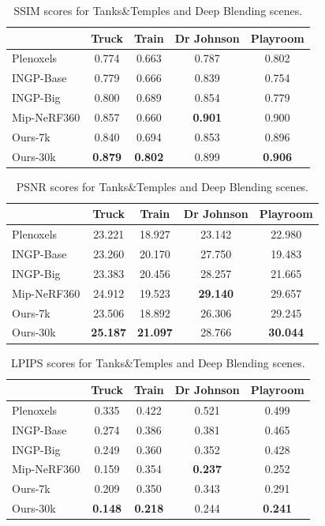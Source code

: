 \begin{appendix}
	\begin{table}[H]
	\caption{SSIM scores for Tanks\&Temples and Deep Blending scenes. }
		\centering
    \begin{tabular}{l|cc|cc}
	~ & Truck & Train & Dr Johnson & Playroom \\ \hline
	Plenoxels & 0.774 & 0.663 & 0.787 & 0.802 \\
	INGP-Base & 0.779 & 0.666 & 0.839 & 0.754 \\
	INGP-Big & 0.800 & 0.689 & 0.854 & 0.779 \\
	Mip-NeRF360 & 0.857 & 0.660 & \textbf{0.901} & 0.900 \\
	Ours-7k & 0.840 & 0.694 & 0.853 & 0.896 \\
	Ours-30k & \textbf{0.879} & \textbf{0.802} & 0.899 & \textbf{0.906} \\
\end{tabular}
\end{table}
	\begin{table}[H]
	\caption{PSNR scores for Tanks\&Temples and Deep Blending scenes. }
		\centering
		\begin{tabular}{l|cc|cc}
			~ & Truck  & Train & Dr Johnson & Playroom \\ \hline
			Plenoxels & 23.221 & 18.927 & 23.142 & 22.980 \\
			INGP-Base & 23.260  & 20.170 & 27.750 & 19.483 \\
			INGP-Big & 23.383  & 20.456 & 28.257 & 21.665 \\
			Mip-NeRF360 & 24.912  & 19.523 & \textbf{29.140} & 29.657 \\
			Ours-7k & 23.506  & 18.892 & 26.306 & 29.245 \\
			Ours-30k & \textbf{25.187} & \textbf{21.097} & 28.766 & \textbf{30.044} \\
		\end{tabular}
\end{table}


	\begin{table}[H]
	\caption{LPIPS scores for Tanks\&Temples and Deep Blending scenes. }
		\centering
    \begin{tabular}{l|cc|cc}
	~ & Truck & Train & Dr Johnson & Playroom \\ \hline
	Plenoxels & 0.335 & 0.422 & 0.521 & 0.499 \\
	INGP-Base & 0.274 & 0.386 & 0.381 & 0.465 \\
	INGP-Big & 0.249 & 0.360 & 0.352 & 0.428 \\
	Mip-NeRF360 & 0.159 & 0.354 & \textbf{0.237} & 0.252 \\
	Ours-7k & 0.209 & 0.350 & 0.343 & 0.291 \\
	Ours-30k & \textbf{0.148} & \textbf{0.218} & 0.244 & \textbf{0.241} \\
\end{tabular}
		\label{tab:ttdb_scene_lpips}
\end{table}

\end{appendix}
